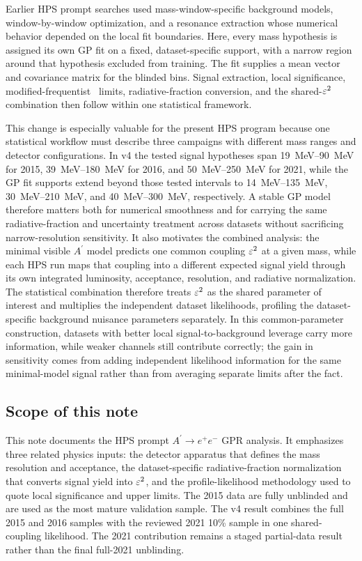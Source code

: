 Earlier HPS prompt searches used mass-window-specific background models,
window-by-window optimization, and a resonance extraction whose numerical behavior
depended on the local fit boundaries. Here, every mass hypothesis is assigned its own
GP fit on a fixed, dataset-specific support, with a narrow region around that hypothesis
excluded from training. The fit supplies a mean vector and covariance matrix for the
blinded bins. Signal extraction, local significance, modified-frequentist \CLs\ limits,
radiative-fraction conversion, and the shared-$\varepsilon^2$ combination then follow within
one statistical framework.

This change is especially valuable for the present HPS program because one statistical
workflow must describe three campaigns with different mass ranges and detector
configurations. In v4 the tested signal hypotheses span \SIrange{19}{90}{MeV} for
2015, \SIrange{39}{180}{MeV} for 2016, and \SIrange{50}{250}{MeV} for 2021, while
the GP fit supports extend beyond those tested intervals to
\SIrange{14}{135}{MeV}, \SIrange{30}{210}{MeV}, and
\SIrange{40}{300}{MeV}, respectively. A stable GP model therefore matters both for
numerical smoothness and for carrying the same radiative-fraction and uncertainty
treatment across datasets without sacrificing narrow-resolution sensitivity. It also
motivates the combined analysis:
the minimal visible $A^\prime$ model predicts one common coupling $\varepsilon^2$ at a given
mass, while each HPS run maps that coupling into a different expected signal yield
through its own integrated luminosity, acceptance, resolution, and radiative
normalization. The
statistical combination therefore treats $\varepsilon^2$ as the shared parameter of interest
and multiplies the independent dataset likelihoods, profiling the dataset-specific
background nuisance parameters separately. In this common-parameter construction,
datasets with better local signal-to-background leverage carry more information, while
weaker channels still contribute correctly; the gain in sensitivity comes from adding
independent likelihood information for the same minimal-model signal rather than from
averaging separate limits after the fact.

\subsection{Scope of this note}

This note documents the HPS prompt $A^\prime \rightarrow e^+e^-$ GPR analysis. It
emphasizes three related physics inputs: the detector apparatus that defines the mass
resolution and acceptance, the dataset-specific radiative-fraction normalization that
converts signal yield into
$\varepsilon^2$, and the profile-likelihood methodology used to quote local significance and
upper limits. The 2015 data are fully unblinded and are used as the most mature
validation sample. The v4 result combines the full 2015 and 2016 samples with the
reviewed 2021 10\% sample in one shared-coupling likelihood. The 2021 contribution
remains a staged partial-data result rather than the final full-2021 unblinding.

